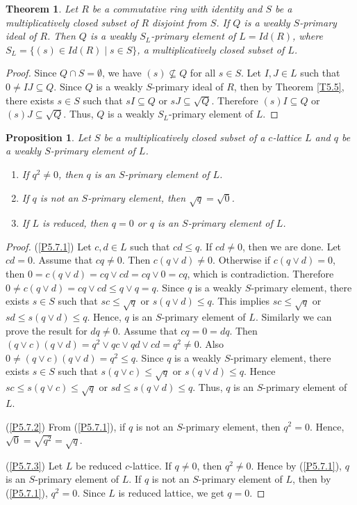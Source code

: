 \documentclass[10pt,twoside,a4paper]{amsart}
\numberwithin{equation}{section}
\theoremstyle{plain}
\newtheorem{thm}[lem]{Theorem}
\newtheorem{prop}[lem]{Proposition}
\theoremstyle{definition}
\begin{document}
\begin{thm}%
	Let $R$ be a commutative ring with identity and $S$ be a multiplicatively closed subset of $R$ disjoint from $S$. If $Q$ is a weakly $S$-primary ideal of $R$. Then $Q$ is a weakly $S_L$-primary element of $L = Id(R)$, where $S_L = \{(s) \in Id(R) \;|\; s \in S\}$, a multiplicatively closed subset of $L$.
\end{thm}
\begin{proof}
	Since $Q \cap S=\emptyset$, we have $(s)\nsubseteq Q$ for all $s\in S$. Let $I,J\in L$ such that $0\neq IJ\subseteq Q$. Since $Q$  is a weakly $S$-primary ideal of $R$, then by Theorem \ref{T5.5},  there exists $s\in S$ such that $sI\subseteq Q$ or $sJ\subseteq \sqrt{Q}$. Therefore $(s)I\subseteq Q$ or $(s)J\subseteq \sqrt{Q}$. Thus, $Q$ is a weakly $S_L$-primary element of $L$. 
\end{proof}


\begin{prop}\label{P5.7}
	Let $S$ be a multiplicatively closed subset of a $c$-lattice $L$ and $q$ be a weakly $S$-primary element of $L$.
	\begin{enumerate}
		\item\label{P5.7.1} If $q^2\neq 0$, then $q$ is an $S$-primary element of $L$.
		\item\label{P5.7.2} If $q$ is not an $S$-primary element, then $\sqrt{q}=\sqrt{0}$. 
		\item\label{P5.7.3} If $L$ is reduced, then $q=0$ or $q$ is an  $S$-primary element of $L$.
		
	\end{enumerate}
\end{prop}
\begin{proof}
	(\ref{P5.7.1}) Let $c,d \in L$ such that $cd \leq q$. If $cd \neq 0$, then we are done. Let $cd=0$. Assume that $cq \neq 0$. Then $c(q \vee d) \neq 0$. Otherwise if $c (q \vee d)=0$, then $0=c(q\vee d)=cq \vee cd = cq\vee 0=cq$, which is contradiction. Therefore $0 \neq c(q\vee d)=cq\vee cd\leq q\vee q=q$. Since $q$ is a weakly $S$-primary element, there exists $s\in S$ such that $sc\leq \sqrt{q}$ or $s(q\vee d)\leq q$. This implies $sc\leq \sqrt{q}$ or $sd\leq s(q\vee d)\leq q$. Hence, $q$ is an $S$-primary element of $L$. Similarly we can prove the result for $dq\neq 0$. Assume that $cq=0=dq$. Then $(q\vee c)(q\vee d)=q^2\vee  qc\vee  qd\vee  cd =q^2\neq 0$. Also $0\neq (q\vee c)(q \vee d)=q^2\leq q$. Since $q$ is a weakly $S$-primary element, there exists $s\in S$ such that $s(q\vee c)\leq \sqrt{q}$ or $s(q\vee d)\leq q$. Hence $sc\leq s(q\vee c)\leq \sqrt{q}$ or $sd \leq s(q \vee d)\leq q$. Thus, $q$ is an $S$-primary element of $L$.
	
	(\ref{P5.7.2}) From (\ref{P5.7.1}), if $q$ is not an $S$-primary element, then $q^2=0$. Hence, $\sqrt{0}=\sqrt{q^2}=\sqrt{q}$.
	
	(\ref{P5.7.3}) Let $L$ be reduced $c$-lattice. If $q \neq 0$, then $q^2\neq 0$. Hence by (\ref{P5.7.1}), $q$ is an $S$-primary element of $L$. If $q$ is not an $S$-primary element of $L$, then by (\ref{P5.7.1}), $q^2 = 0$. Since $L$ is reduced lattice, we get $q=0$. \end{proof}
\end{document}
